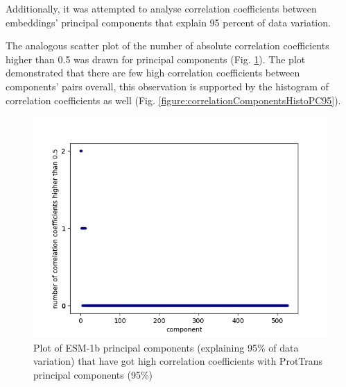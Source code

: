 \documentclass[12pt]{article}
\begin{document}
	\newpage

	Additionally, it was attempted to analyse correlation coefficients between 
	embeddings' principal components that explain 95 percent of data variation.

	The analogous scatter plot of the number of absolute correlation 
	coefficients higher than 0.5 was drawn for principal components
	(Fig. \ref{figure:highCorrelationComponentsPC95}). The plot 
	demonstrated that there are few high correlation coefficients 
	between components' pairs overall, this observation is supported 
	by the histogram of correlation coefficients as well 
	(Fig. \ref{figure:correlationComponentsHistoPC95}).

	\begin{figure}[h!]
		\centering
		\includegraphics[scale=0.85]{validation_small_set_2_joined_PC_95_correlation_high_corr.png}

		\caption{Plot of ESM-1b principal components (explaining 
		95\% of data variation) that have got high correlation coefficients 
		with ProtTrans principal components (95\%)}
		\label{figure:highCorrelationComponentsPC95}
	\end{figure}

	\newpage
\end{document}
